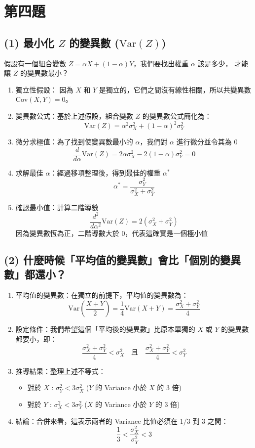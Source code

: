\documentclass{article}
\begin{document}
\hrulefill

\section*{第四題}
\subsection*{(1) 最小化 $Z$ 的變異數 ($\mathrm{Var}(Z)$)}
假設有一個組合變數 $Z = \alpha X + (1-\alpha)Y$，我們要找出權重 $\alpha$ 該是多少，
才能讓 $Z$ 的變異數最小？

\begin{enumerate}
    \item 獨立性假設：
    因為 $X$ 和 $Y$ 是獨立的，它們之間沒有線性相關，所以共變異數 $\mathrm{Cov}(X,Y) = 0$。
    \item 變異數公式：基於上述假設，組合變數 $Z$ 的變異數公式簡化為：
    \[
    \mathrm{Var}(Z) = \alpha^2\sigma_X^2 + (1-\alpha)^2\sigma_Y^2
    \]
    \item 微分求極值：為了找到使變異數最小的 $\alpha$，我們對 $\alpha$ 進行微分並令其為 0 
    \[
    \frac{d}{d\alpha}\mathrm{Var}(Z) = 2\alpha \sigma_X^2 - 2(1-\alpha)\sigma_Y^2 = 0
    \]
    \item 求解最佳 $\alpha$：經過移項整理後，得到最佳的權重 $\alpha^*$
    \[
    \alpha^* = \frac{\sigma_Y^2}{\sigma_X^2 + \sigma_Y^2}
    \]
    \item 確認最小值：計算二階導數 
    $$\frac{d^2}{d\alpha^2}\mathrm{Var}(Z) = 2(\sigma_X^2 + \sigma_Y^2)$$
    因為變異數恆為正，二階導數大於 0，代表這確實是一個極小值
\end{enumerate}

\subsection*{(2) 什麼時候「平均值的變異數」會比「個別的變異數」都還小？}
\begin{enumerate}
    \item 平均值的變異數：在獨立的前提下，平均值的變異數為：
    $$
    \mathrm{Var}\left(\frac{X+Y}{2}\right) = \frac{1}{4}\mathrm{Var}(X+Y) = 
    \frac{\sigma_X^2 + \sigma_Y^2}{4}
    $$
    \item 設定條件：我們希望這個「平均後的變異數」比原本單獨的 $X$ 或 $Y$ 的變異數都要小，即：
    $$
    \frac{\sigma_X^2 + \sigma_Y^2}{4} < \sigma_X^2 \quad \text{且} 
    \quad \frac{\sigma_X^2 + \sigma_Y^2}{4} < \sigma_Y^2
    $$
    \item 推導結果：整理上述不等式：
    \begin{itemize}
        \item 對於 $X$ : $\sigma_Y^2 < 3\sigma_X^2$ ($Y$ 的 Variance 小於 $X$ 的 3 倍)
        \item 對於 $Y$ : $\sigma_X^2 < 3\sigma_Y^2$ ($X$ 的 Variance 小於 $Y$ 的 3 倍)
    \end{itemize}
    \item 結論：合併來看，這表示兩者的 Variance 比值必須在 $1/3$ 到 $3$ 之間：
    $$\boxed{\frac{1}{3} < \frac{\sigma_X^2}{\sigma_Y^2} < 3}$$
\end{enumerate}
\end{document}

